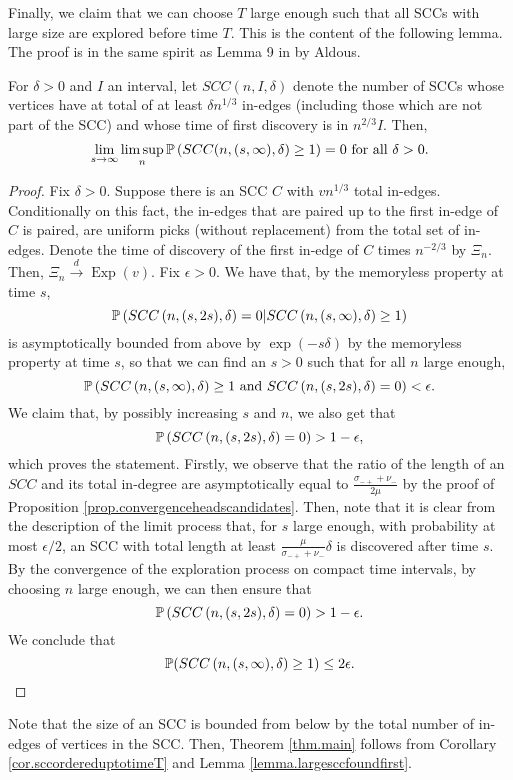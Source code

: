 Finally, we claim that we can choose $T$ large enough such that all SCCs with large size are explored before time $T$. This is the content of the following lemma. The proof is in the same spirit as Lemma 9 in \cite{aldous_1991} by Aldous. 
\begin{lemma}\label{lemma.largesccfoundfirst}
For $\delta>0$ and $I$ an interval, let $SCC(n,I,\delta)$ denote the number of SCCs whose vertices have at total of at least $\delta n^{1/3}$ in-edges (including those which are not part of the SCC) and whose time of first discovery is in $n^{2/3}I$. Then,
$$\lim_{s\to \infty}\limsup_{n} \P\left(SCC(n,(s,\infty),\delta)\geq 1\right)=0\text{ for all }\delta>0.$$
\end{lemma}
\begin{proof}
Fix $\delta>0$. Suppose there is an SCC $C$ with $vn^{1/3}$ total in-edges. Conditionally on this fact, the in-edges that are paired up to the first in-edge of $C$ is paired, are uniform picks (without replacement) from the total set of in-edges. Denote the time of discovery of the first in-edge of $C$ times $n^{-2/3}$ by $\Xi_n$. Then, $\Xi_n\overset{d}{\to}\operatorname{Exp}(v)$. Fix $\epsilon>0$. We have that, by the memoryless property at time $s$,
$$\P\left(SCC\left(n,(s,2s),\delta\right)=0|SCC\left(n,(s,\infty),\delta\right)\geq 1\right)$$
is asymptotically bounded from above by 
$\exp(-s\delta)$ by the memoryless property at time $s$, so that we can find an $s>0$ such that for all $n$ large enough,
$$\P\left(SCC\left(n,(s,\infty),\delta\right)\geq 1 \text{ and }SCC\left(n,(s,2s),\delta\right)=0\right)<\epsilon.$$
We claim that, by possibly increasing $s$ and $n$, we also get that 
$$\P\left(SCC\left(n,(s,2s),\delta\right)=0\right)>1-\epsilon,$$
which proves the statement.
Firstly, we observe that the ratio of the length of an $SCC$ and its total in-degree are asymptotically equal to $\frac{\sigma_{-+}+\nu_-}{2\mu}$ by the proof of Proposition \ref{prop.convergenceheadscandidates}. Then, note that it is clear from the description of the limit process that, for $s$ large enough, with probability at most $\epsilon/2$, an SCC with total length at least $\frac{\mu}{\sigma_{-+}+\nu_-}\delta$ is discovered after time $s$. By the convergence of the exploration process on compact time intervals, by choosing $n$ large enough, we can then ensure that 
$$\P\left(SCC\left(n,(s,2s),\delta\right)=0\right)>1-\epsilon.$$
We conclude that 
$$\P(SCC\left(n,(s,\infty),\delta\right)\geq 1)\leq 2\epsilon.$$
\end{proof}
Note that the size of an SCC is bounded from below by the total number of in-edges of vertices in the SCC. Then, Theorem \ref{thm.main} follows from Corollary \ref{cor.sccordereduptotimeT} and Lemma \ref{lemma.largesccfoundfirst}. 

